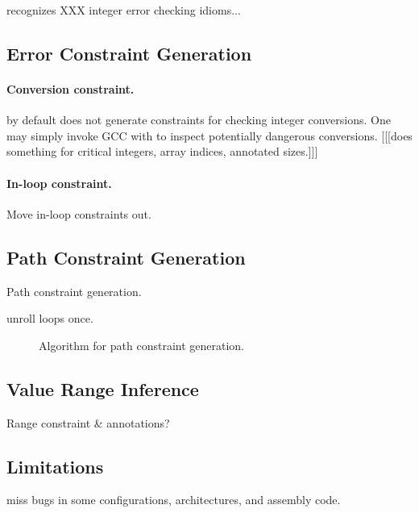 \sys recognizes XXX integer error checking idioms...

\subsection{Error Constraint Generation}

\paragraph{Conversion constraint.}
\sys by default does not generate constraints for checking integer
conversions.  One may simply invoke GCC with  to
inspect potentially dangerous conversions.
[[[\sys does something for critical integers, array indices, annotated sizes.]]]

\paragraph{In-loop constraint.}
Move in-loop constraints out.

\subsection{Path Constraint Generation}

Path constraint generation.

unroll loops once.

\begin{figure}

\caption{Algorithm for path constraint generation.}
\label{f:path-cstr}
\end{figure}

\subsection{Value Range Inference}

Range constraint \& annotations?

\subsection{Limitations}

miss bugs in some configurations, architectures,
and assembly code.
